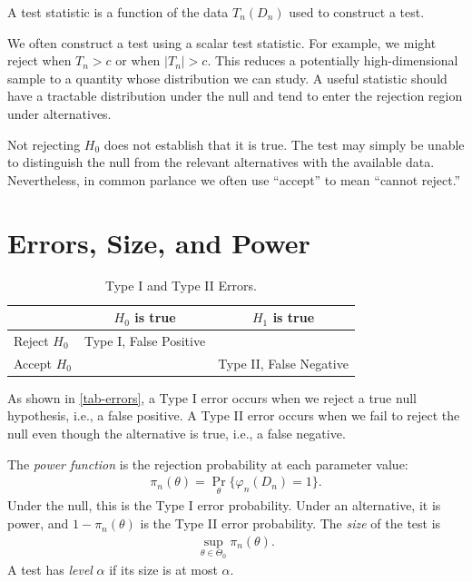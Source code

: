 \documentclass[a4paper,12pt]{article}
\begin{document}
\begin{definition}
	A test statistic is a function of the data $T_n(D_n)$ used to construct a test.
\end{definition}

\begin{remark}
	We often construct a test using a scalar test statistic.
	For example, we might reject when $T_n>c$ or when $|T_n|>c$.
	This reduces a potentially high-dimensional sample to a quantity whose distribution we can study.
	A useful statistic should have a tractable distribution under the null
	and tend to enter the rejection region under alternatives.
\end{remark}

\begin{remark}
	Not rejecting $H_0$ does not establish that it is true.
	The test may simply be unable to distinguish the null from the relevant alternatives with the available data.
	Nevertheless, in common parlance we often use ``accept'' to mean ``cannot reject.''
\end{remark}

\section{Errors, Size, and Power}

\begin{table}[t]
	\centering
	\begin{tabular}{l|cc}
		\toprule
		& $H_0$ is true & $H_1$ is true \\
		\midrule
		Reject $H_0$ & Type I, False Positive &  \\
		Accept $H_0$ &  & Type II, False Negative \\
		\bottomrule
	\end{tabular}
	\caption{Type I and Type II Errors.}
	\label{tab-errors}
\end{table}

As shown in \autoref{tab-errors}, a Type I error occurs when we reject a true null hypothesis,
i.e., a false positive.
A Type II error occurs when we fail to reject the null even though the alternative is true,
i.e., a false negative.

\begin{definition}
	The \emph{power function} is the rejection probability at each parameter value:
	\begin{align}
		\pi_n(\theta)=\Pr_\theta\{\varphi_n(D_n)=1\}.
	\end{align}
	Under the null, this is the Type I error probability.
	Under an alternative, it is power, and $1-\pi_n(\theta)$ is the Type II error probability.
	The \emph{size} of the test is
	\begin{align}
		\sup_{\theta\in\Theta_0}\pi_n(\theta).
	\end{align}
	A test has \emph{level} $\alpha$ if its size is at most $\alpha$.
\end{definition}
\end{document}

